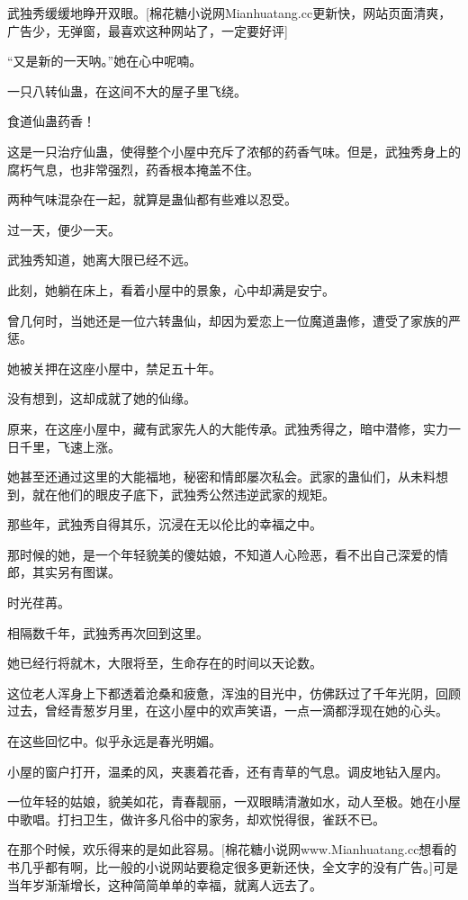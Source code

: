 
\begin{this_body}

武独秀缓缓地睁开双眼。[棉花糖小说网Mianhuatang.cc更新快，网站页面清爽，广告少，无弹窗，最喜欢这种网站了，一定要好评]

“又是新的一天呐。”她在心中呢喃。

一只八转仙蛊，在这间不大的屋子里飞绕。

食道仙蛊药香！

这是一只治疗仙蛊，使得整个小屋中充斥了浓郁的药香气味。但是，武独秀身上的腐朽气息，也非常强烈，药香根本掩盖不住。

两种气味混杂在一起，就算是蛊仙都有些难以忍受。

过一天，便少一天。

武独秀知道，她离大限已经不远。

此刻，她躺在床上，看着小屋中的景象，心中却满是安宁。

曾几何时，当她还是一位六转蛊仙，却因为爱恋上一位魔道蛊修，遭受了家族的严惩。

她被关押在这座小屋中，禁足五十年。

没有想到，这却成就了她的仙缘。

原来，在这座小屋中，藏有武家先人的大能传承。武独秀得之，暗中潜修，实力一日千里，飞速上涨。

她甚至还通过这里的大能福地，秘密和情郎屡次私会。武家的蛊仙们，从未料想到，就在他们的眼皮子底下，武独秀公然违逆武家的规矩。

那些年，武独秀自得其乐，沉浸在无以伦比的幸福之中。

那时候的她，是一个年轻貌美的傻姑娘，不知道人心险恶，看不出自己深爱的情郎，其实另有图谋。

时光荏苒。

相隔数千年，武独秀再次回到这里。

她已经行将就木，大限将至，生命存在的时间以天论数。

这位老人浑身上下都透着沧桑和疲惫，浑浊的目光中，仿佛跃过了千年光阴，回顾过去，曾经青葱岁月里，在这小屋中的欢声笑语，一点一滴都浮现在她的心头。

在这些回忆中。似乎永远是春光明媚。

小屋的窗户打开，温柔的风，夹裹着花香，还有青草的气息。调皮地钻入屋内。

一位年轻的姑娘，貌美如花，青春靓丽，一双眼睛清澈如水，动人至极。她在小屋中歌唱。打扫卫生，做许多凡俗中的家务，却欢悦得很，雀跃不已。

在那个时候，欢乐得来的是如此容易。[棉花糖小说网www.Mianhuatang.cc想看的书几乎都有啊，比一般的小说网站要稳定很多更新还快，全文字的没有广告。]可是当年岁渐渐增长，这种简简单单的幸福，就离人远去了。


\end{this_body}
